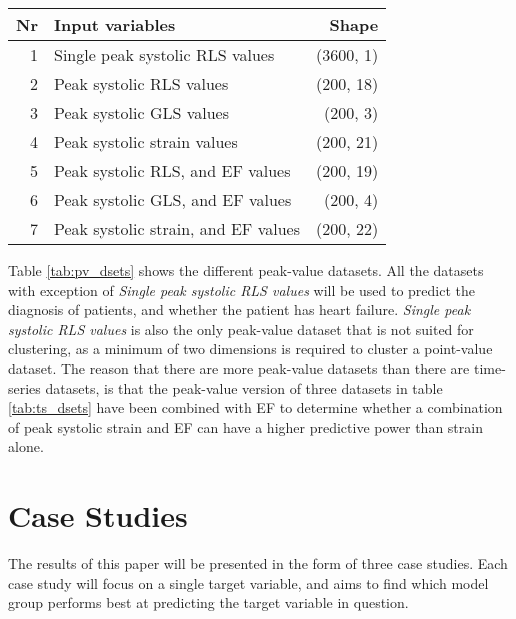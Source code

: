 \begin{table*}[h]
    \centering
    \begin{tabular}{ rlr }
        \toprule
        Nr & Input variables                     & Shape \\
        \midrule                              
        1  & Single peak systolic RLS values     & (3600, 1) \\
        2  & Peak systolic RLS values            & (200, 18) \\
        3  & Peak systolic GLS values            & (200, 3)  \\
        4  & Peak systolic strain values         & (200, 21) \\
        5  & Peak systolic RLS, and EF values    & (200, 19) \\
        6  & Peak systolic GLS, and EF values    & (200, 4)  \\
        7  & Peak systolic strain, and EF values & (200, 22) \\
        \bottomrule
    \end{tabular}
    \caption{Peak-value datasets. The ''Shape'' parameter is indicates: (Number of objects in the dataset, Number of dimensions of each individual object).}
    \label{tab:pv_dsets}
\end{table*}

Table \ref{tab:pv_dsets} shows the different peak-value datasets. 
All the datasets with exception of \textit{Single peak systolic RLS values} will be used to predict the diagnosis of patients, and whether the patient has heart failure. 
\textit{Single peak systolic RLS values} is also the only peak-value dataset that is not suited for clustering, as a minimum of two dimensions is required to cluster a point-value dataset.
The reason that there are more peak-value datasets than there are time-series datasets, is that the peak-value version of three datasets in table \ref{tab:ts_dsets} have been combined 
with EF to determine whether a combination of peak systolic strain and EF can have a higher predictive power than strain alone.

\section{Case Studies}
The results of this paper will be presented in the form of three case studies. 
Each case study will focus on a single target variable, and aims to find which model group performs best at predicting the target variable in question.

